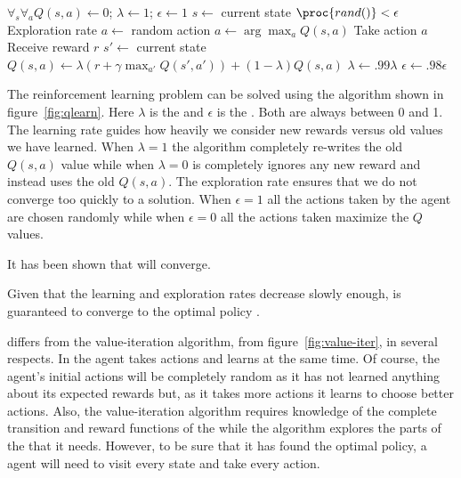 \begin{SCfigure}
  \begin{minipage}{1.0\linewidth}
  \begin{codebox}
    \li $\forall_{s} \forall_a Q(s,a) \gets 0$; $\lambda \gets 1$;
    $\epsilon \gets 1$      
    \li $s \gets$ current state
    \li \If $\proc{rand()} < \epsilon$ \>\>\>\>\> \Comment Exploration rate
    \li \Then $a \gets $ random action
    \li \Else $a \gets \arg \max_a Q(s,a)$
    \End
    \li Take action $a$
    \li Receive reward $r$
    \li $s' \gets$ current state
    \li $Q(s,a) \gets \lambda (r +  \gamma \max_{a'}Q(s',a')) + (1-\lambda)Q(s,a)$
    \li $\lambda \gets .99 \lambda$
    \li $\epsilon \gets .98 \epsilon$
    \li {}
  \end{codebox}
  \end{minipage}
  \caption{ algorithm. Note that the $.99$ and
    $.98$ numbers are domain-dependent and need to be changed for
    each problem to ensure that the algorithm works. With $\epsilon
    \gets 0$ the algorithm is still guaranteed to work, but in
    practice it might take longer to converge.}
  \label{fig:qlearn}
\end{SCfigure}

The reinforcement learning problem can be solved using the
 algorithm shown in figure~\ref{fig:qlearn}.  Here
$\lambda$ is the  and $\epsilon$ is the
.  Both are always between 0 and 1. The learning
rate guides how heavily we consider new rewards versus old values we
have learned. When $\lambda = 1$ the algorithm completely re-writes
the old $Q(s,a)$ value while when $\lambda = 0$ is completely ignores
any new reward and instead uses the old $Q(s,a)$. The exploration rate
ensures that we do not converge too quickly to a solution. When
$\epsilon = 1$ all the actions taken by the agent are chosen randomly
while when $\epsilon = 0$ all the actions taken maximize the $Q$
values.

It has been shown that  will
converge.

\begin{theorem} Given that the learning
  and exploration rates decrease slowly enough,  is
  guaranteed to converge to the optimal policy \cite{watkins92a} .
\end{theorem}

 differs from the value-iteration algorithm, from
figure~\ref{fig:value-iter}, in several respects. In 
the agent takes actions and learns at the same time. Of course, the
agent's initial actions will be completely random as it has not
learned anything about its expected rewards but, as it takes more
actions it learns to choose better actions. Also, the value-iteration
algorithm requires knowledge of the complete transition and reward
functions of the  while the  algorithm
explores the parts of the  that it needs. However, to be
sure that it has found the optimal policy, a  agent
will need to visit every state and take every action.

